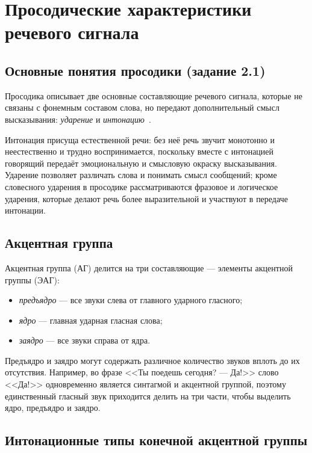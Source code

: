 \section{Просодические характеристики речевого сигнала}

\subsection{Основные понятия просодики (задание 2.1)}

Просодика описывает две основные составляющие речевого сигнала, которые
не связаны с фонемным составом слова, но передают дополнительный смысл
высказывания: \emph{ударение} и \emph{интонацию}~\cite{lobanov}.

Интонация присуща естественной речи: без неё речь звучит монотонно и
неестественно и трудно воспринимается, поскольку вместе с интонацией
говорящий передаёт эмоциональную и смысловую окраску высказывания.
Ударение позволяет различать слова и понимать смысл сообщений; кроме
словесного ударения в просодике рассматриваются фразовое и логическое
ударения, которые делают речь более выразительной и участвуют в передаче
интонации.

\subsection{Акцентная группа}

Акцентная группа (АГ) делится на три составляющие --- элементы акцентной
группы (ЭАГ):
\begin{itemize}
	\item \emph{предъядро} --- все звуки слева от главного ударного гласного;
	\item \emph{ядро} --- главная ударная гласная слова;
	\item \emph{заядро} --- все звуки справа от ядра.
\end{itemize}
Предъядро и заядро могут содержать различное количество звуков вплоть до
их отсутствия. Например, во фразе <<Ты поедешь сегодня? --- Да!>> слово
<<Да!>> одновременно является синтагмой и акцентной группой, поэтому
единственный гласный звук приходится делить на три части, чтобы выделить
ядро, предъядро и заядро.

\subsection{Интонационные типы конечной акцентной группы}

